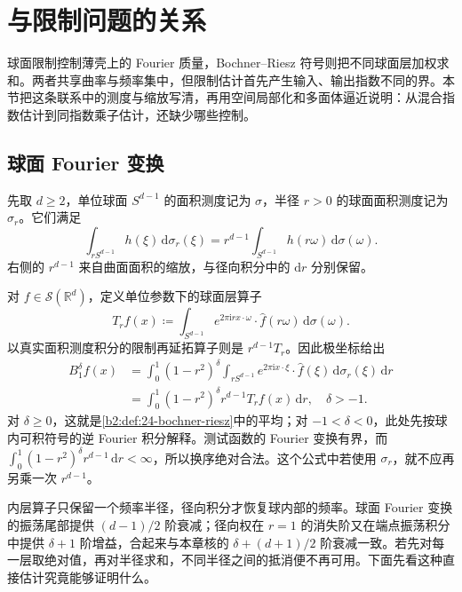 \section{与限制问题的关系}
\label{b2:sec:2404}

球面限制控制薄壳上的 Fourier 质量，Bochner--Riesz 符号则把不同球面层加权求和。两者共享曲率与频率集中，但限制估计首先产生输入、输出指数不同的界。本节把这条联系中的测度与缩放写清，再用空间局部化和多面体逼近说明：从混合指数估计到同指数乘子估计，还缺少哪些控制。

\subsection{球面 Fourier 变换}
\label{b2:subsec:240401}

先取 \(d\geq2\)，单位球面 \(S^{d-1}\) 的面积测度记为 \(\sigma\)，半径 \(r>0\) 的球面面积测度记为 \(\sigma_r\)。它们满足
\[
 \int_{rS^{d-1}}h(\xi)\,\mathrm d\sigma_r(\xi)
 =r^{d-1}\int_{S^{d-1}}h(r\omega)\,\mathrm d\sigma(\omega).
\]
右侧的 \(r^{d-1}\) 来自曲面面积的缩放，与径向积分中的 \(\mathrm dr\) 分别保留。

对 \(f\in\mathcal S(\mathbb R^d)\)，定义单位参数下的球面层算子
\[
 T_rf(x)\coloneqq
 \int_{S^{d-1}}e^{2\pi\mathrm i r x\cdot\omega}
       \cdot\widehat f(r\omega)\,\mathrm d\sigma(\omega).
\]
以真实面积测度积分的限制再延拓算子则是 \(r^{d-1}T_r\)。因此极坐标给出
\begin{equation}\label{b2:eq:24-layer-measure}
 \begin{aligned}
 B_1^\delta f(x)
 &=\int_0^1(1-r^2)^\delta
       \int_{rS^{d-1}}e^{2\pi\mathrm i x\cdot\xi}
          \cdot\widehat f(\xi)\,\mathrm d\sigma_r(\xi)\,\mathrm dr\\
 &=\int_0^1(1-r^2)^\delta r^{d-1}T_rf(x)\,\mathrm dr,
 \quad \delta>-1.
 \end{aligned}
\end{equation}
对 \(\delta\geq0\)，这就是\cref{b2:def:24-bochner-riesz}中的平均；对 \(-1<\delta<0\)，此处先按球内可积符号的逆 Fourier 积分解释。测试函数的 Fourier 变换有界，而
\(\int_0^1(1-r^2)^\delta r^{d-1}\,\mathrm dr<\infty\)，所以换序绝对合法。这个公式中若使用 \(\sigma_r\)，就不应再另乘一次 \(r^{d-1}\)。

\ProseParagraphBreak
内层算子只保留一个频率半径，径向积分才恢复球内部的频率。球面 Fourier 变换的振荡尾部提供 \((d-1)/2\) 阶衰减；径向权在 \(r=1\) 的消失阶又在端点振荡积分中提供 \(\delta+1\) 阶增益，合起来与本章核的 \(\delta+(d+1)/2\) 阶衰减一致。若先对每一层取绝对值，再对半径求和，不同半径之间的抵消便不再可用。下面先看这种直接估计究竟能够证明什么。

